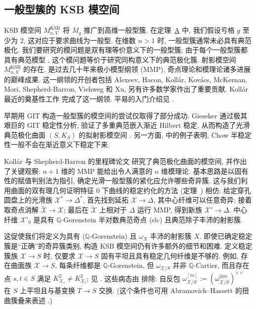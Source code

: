 \subsection{一般型簇的 KSB 模空间}\label{src:10.1.3-subsection}
KSB 模空间 $M_{n,V}^{\mathrm{KSB}}$ 将 $\overline M_g$ 推广到高维一般型簇. 在定理~\hyperref[thm:A]{A} 中, 我们假设亏格 $g$ 至少为 $2$, 这对应于要求曲线为一般型. 在维数 $n>1$ 时, 一般型簇通常未必具有典范极化. 我们要研究的模问题是双有理等价意义下的一般型簇; 由于每个一般型簇都具有典范模型 \cite{BCHM10}, 这个模问题等价于研究同构意义下的典范极化簇. 射影模空间 $M_{n,V}^{\mathrm{KSB}}$ 的存在, 是过去几十年来极小模型纲领 (MMP), 奇点理论和模理论诸多进展的巅峰成果. 这一纲领的开创者包括 Alexeev, Hacon, Koll\'ar, Kov\'acs, McKernan, Mori, Shepherd-Barron, Viehweg 和 Xu, 另有许多数学家作出了重要贡献. Koll\'ar 最近的奠基性工作 \cite{Kol23} 完成了这一纲领. 平易的入门介绍见 \cite{Kov09}.

早期用 GIT 构造一般型簇的模空间的尝试仅取得了部分成功. Gieseker 通过极其艰巨的 GIT 稳定性分析, 验证了多重典范嵌入渐近 Hilbert 稳定, 从而构造了光滑典范极化曲面 $(S,K_S)$ 的拟射影模空间 \cite{Gie77b}. 另一方面, \cite{WX14} 中的例子表明, Chow 半稳定性一般不会在渐近意义下稳定下来.

Koll\'ar 与 Shepherd-Barron 的里程碑论文 \cite{KSB88} 研究了典范极化曲面的模空间, 并作出了关键观察: $n+1$ 维的 MMP 能给出令人满意的 $n$ 维模理论. 基本思路是以固有性的赋值判别法为指引, 确定光滑一般型簇的紧化应允许哪些奇异簇. 这与我们利用曲面的双有理几何证明特征 $0$ 下曲线的稳定约化的方法 (定理~) 相仿: 给定穿孔圆盘上的光滑族 $\mathcal X^*\to\Delta^*$, 首先找到延拓 $\mathcal X\to\Delta$, 其中心纤维可以任意奇异; 接着取奇点消解 $\widetilde{\mathcal X}\to\mathcal X$; 最后在 $\widetilde{\mathcal X}$ 上相对于 $\Delta$ 运行 MMP, 得到新族 $\mathcal X'\to\Delta$. 中心纤维 $\mathcal X'_0$ 是具有 $\mathbb Q$-Gorenstein 半对数典范奇点 (slc) 且典范除子丰沛的射影簇.

这促使我们将定义为具有 ($\mathbb Q$-Gorenstein) 且 $\omega_X$ 丰沛的射影簇 $X$. 即使已确定稳定簇是``正确''的奇异簇类别, 构造 KSB 模空间仍有许多额外的细节和困难. 定义稳定簇族 $\mathcal X\to S$ 时, 仅要求 $\mathcal X\to S$ 固有平坦且具有稳定几何纤维是不够的. 例如, 存在曲面族 $\mathcal X\to S$, 每条纤维都是 $\mathbb Q$-Gorenstein, 但 $\omega_{\mathcal X/S}$ 并非 $\mathbb Q$-Cartier, 而且存在点 $s,t\in S$ 满足 $K_{\mathcal X_s}^2\neq K_{\mathcal X_t}^2$; 见 \cite[例 1.42-7]{Kol23}. 这些病态由 排除: 自反包 $\omega_{\mathcal X/S}^{[m]}:=(\omega_{\mathcal X/S}^{\otimes m})^{\vee\vee}$ 在 $S$ 上平坦且与基变换 $T\to S$ 交换. (这个条件也可用 Abramovich--Hassett 的扭曲簇叠来表述 \cite{AH11}.)

